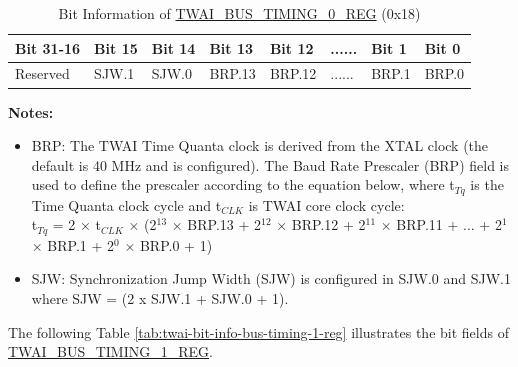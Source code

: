 \documentclass[main\_\_EN.tex]{subfiles}
\begin{document}
\begin{longtable}[c]{|p{2cm}|p{1.5cm}|p{1.5cm}|p{1.5cm}|p{1.5cm}|p{1.5cm}|p{1.5cm}|p{1.5cm}|}
\caption{Bit Information of \hyperref[regdesc:TWAIBUSTIMING0REG]{TWAI\_BUS\_TIMING\_0\_REG} (0x18)}
\label{tab:twai-bit-info-bus-timing-0-reg}\\\hline
\rowcolor{lightgray}
  \textbf{Bit 31-16} & \textbf{Bit 15} & \textbf{Bit 14} & \textbf{Bit 13} & \textbf{Bit 12} & \textbf{......} & \textbf{Bit 1} & \textbf{Bit 0}\\\hline
  Reserved& SJW.1 & SJW.0 & BRP.13 & BRP.12 & ...... & BRP.1 & BRP.0\\\hline
\end{longtable}
\vspace{-1.5em}
{\bfseries Notes:}\\
\begin{itemize}
    \item BRP: The TWAI Time Quanta clock is derived from the XTAL clock (the default is 40 MHz and is configured). The Baud Rate Prescaler (BRP) field is used to define the prescaler according to the equation below, where t$_{Tq}$ is the Time Quanta clock cycle and t$_{CLK}$ is TWAI core clock cycle:\\

t$_{Tq}$ = 2 × t$_{CLK}$ × (2$^{13}$ × BRP.13 + 2$^{12}$ × BRP.12 + 2$^{11}$ × BRP.11 + ... + 2$^1$ × BRP.1 + 2$^0$ × BRP.0 + 1)
    \item SJW: Synchronization Jump Width (SJW) is configured in SJW.0 and SJW.1 where SJW = (2 x SJW.1 + SJW.0 + 1).
\end{itemize}

The following Table \ref{tab:twai-bit-info-bus-timing-1-reg} illustrates the bit fields of \hyperref[regdesc:TWAIBUSTIMING1REG]{TWAI\_BUS\_TIMING\_1\_REG}.
\end{document}
